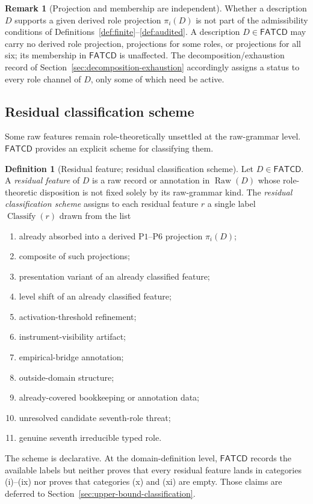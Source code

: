 \documentclass[11pt]{article}
\theoremstyle{definition}
\newtheorem{definition}[theorem]{Definition}
\newtheorem{remark}[theorem]{Remark}
\newcommand{\FATCD}{\ensuremath{\mathsf{FATCD}}}
\newcommand{\Raw}[1]{\ensuremath{\operatorname{Raw}\!\left(#1\right)}}
\newcommand{\Pone}{\ensuremath{\mathrm{P1}}}
\newcommand{\Psix}{\ensuremath{\mathrm{P6}}}
\begin{document}
\begin{remark}[Projection and membership are independent]\label{rem:projection-vs-membership}
Whether a description \(D\) supports a given derived role projection
\(\pi_i(D)\) is not part of the admissibility conditions of
Definitions~\ref{def:finite}--\ref{def:audited}. A description
\(D \in \FATCD{}\) may carry no derived role projection, projections
for some roles, or projections for all six; its membership in
\FATCD{} is unaffected. The decomposition/exhaustion record of
Section~\ref{sec:decomposition-exhaustion} accordingly assigns a
status to every role channel of \(D\), only some of which need be
active.
\end{remark}

\subsection{Residual classification scheme}\label{subsec:residual-classification}

Some raw features remain role-theoretically unsettled at the
raw-grammar level. \FATCD{} provides an explicit scheme for
classifying them.

\begin{definition}[Residual feature; residual classification scheme]\label{def:residual-scheme}
Let \(D \in \FATCD{}\). A \emph{residual feature} of \(D\) is a raw record
or annotation in \(\Raw{D}\) whose role-theoretic disposition is not fixed
solely by its raw-grammar kind. The \emph{residual classification scheme}
assigns to each residual feature \(r\) a single label
\(\operatorname{Classify}(r)\) drawn from the list
\begin{enumerate}[label=(\roman*),topsep=2pt,itemsep=1pt]
  \item already absorbed into a derived \Pone{}--\Psix{} projection
    \(\pi_i(D)\);
  \item composite of such projections;
  \item presentation variant of an already classified feature;
  \item level shift of an already classified feature;
  \item activation-threshold refinement;
  \item instrument-visibility artifact;
  \item empirical-bridge annotation;
  \item outside-domain structure;
  \item already-covered bookkeeping or annotation data;
  \item unresolved candidate seventh-role threat;
  \item genuine seventh irreducible typed role.
\end{enumerate}
The scheme is declarative. At the domain-definition level, \FATCD{} records
the available labels but neither proves that every residual feature lands in
categories (i)--(ix) nor proves that categories (x) and (xi) are empty. Those
claims are deferred to Section~\ref{sec:upper-bound-classification}.
\end{definition}
\end{document}
